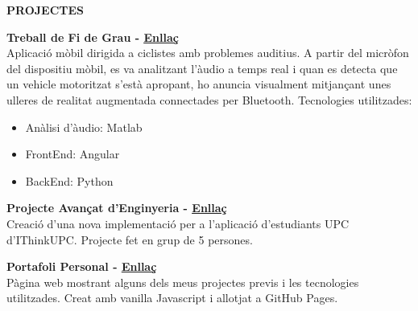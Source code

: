 \documentclass[../main.tex]{subfiles}
\begin{document}
    \textbf{\textcolor{myCV2}{PROJECTES\underline{\hspace{15.55cm}}}}
    \vspace*{0.3cm}
    
    \textbf{Treball de Fi de Grau - 
        \hspace*{0.07cm}
        \textcolor{myCV2}{
        \vspace*{0.1cm}\underline{\href{https://www.youtube.com/watch?v=WKyUsdZbQ0Y}{Enllaç}}}}\\
        Aplicació mòbil dirigida a ciclistes amb problemes auditius. A partir del micròfon del dispositiu mòbil, es va analitzant l'àudio a temps real i quan es detecta que un vehicle motoritzat s'està apropant, ho anuncia visualment mitjançant unes ulleres de realitat augmentada connectades per Bluetooth. Tecnologies utilitzades:
        \begin{itemize}
            \vspace*{-0.2cm}
            \item Anàlisi d'àudio: Matlab
            \vspace*{-0.2cm}
            \item FrontEnd: Angular
            \vspace*{-0.2cm}
            \item BackEnd: Python
        \end {itemize}
        
        \textbf{Projecte Avançat d'Enginyeria - 
         \hspace*{0.07cm}
         \textcolor{myCV2}{
        \vspace*{0.1cm}\underline{\href{https://www.youtube.com/watch?v=RrfiOulhY-E&t=7s}{Enllaç}}}}\\
        Creació d'una nova implementació per a l'aplicació d'estudiants UPC d'IThinkUPC. Projecte fet en grup de 5 persones. 

        \vspace*{0.25cm}
        \textbf{Portafoli Personal - 
         \hspace*{0.07cm}
         \textcolor{myCV2}{
        \vspace*{0.1cm}\underline{\href{https://albatalaya.github.io/}{Enllaç}}}}\\
        Pàgina web mostrant alguns dels meus projectes previs i les tecnologies utilitzades. Creat amb vanilla Javascript i allotjat a GitHub Pages.

        
\end{document}
